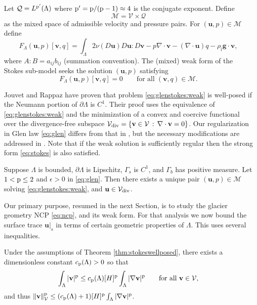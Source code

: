 \documentclass[hidelinks,onefignum,onetabnum,final]{siamart220329}  %
\newcommand{\eps}{\epsilon}
\newcommand{\grad}{\nabla}
\newcommand{\Div}{\nabla\cdot}
\newcommand{\bg}{\mathbf{g}}
\newcommand{\bu}{\mathbf{u}}
\newcommand{\bv}{\mathbf{v}}
\newcommand{\cQ}{\mathcal{Q}}
\newcommand{\cV}{\mathcal{V}}
\newcommand{\pp}{{\text{\textnormal{p}}}}
\newcommand{\rhoi}{\rho_{\text{i}}}
\newcommand{\Vdiv}{\cV_{\text{\textnormal{div}}}}
\begin{document}
Let $\cQ=L^{\pp'}(\Lambda)$ where $\pp'=\pp/(\pp-1)\approx 4$ is the conjugate exponent.  Define
\begin{equation}
\mathcal{M} = \cV \times \cQ \label{eq:glenstokes:mixedspace}
\end{equation}
as the mixed space of admissible velocity and pressure pairs.  For $(\bu,p) \in \mathcal{M}$ define
\begin{equation}
F_\Lambda(\bu,p)[\bv,q] = \int_\Lambda 2 \nu(D\bu) D\bu : D\bv - p \Div\bv - (\Div\bu) q - \rhoi \bg \cdot \bv, \label{eq:glenstokes:fcnl}
\end{equation}
where $A:B=a_{ij}b_{ij}$ (summation convention).  The (mixed) weak form of the Stokes sub-model seeks the solution $(\bu,p)$ satisfying
\begin{equation}
F_\Lambda(\bu,p)[\bv,q] = 0 \qquad \text{for all } (\bv,q) \in \mathcal{M}. \label{eq:glenstokes:weak}
\end{equation}

Jouvet and Rappaz \cite{JouvetRappaz2011} have proven that problem \eqref{eq:glenstokes:weak} is well-posed if the Neumann portion of $\partial\Lambda$ is $C^1$.  Their proof uses the equivalence of \eqref{eq:glenstokes:weak} and the minimization of a convex and coercive functional over the divergence-free subspace $\Vdiv = \{\bv\in\cV\,:\,\Div\bv=0\}$.  Our regularization in Glen law \eqref{eq:glen} differs from that in \cite{JouvetRappaz2011}, but the necessary modifications are addressed in \cite{IsaacStadlerGhattas2015}.  Note that if the weak solution is sufficiently regular then the strong form \eqref{eq:stokes} is also satisfied.

\begin{theorem} \label{thm:stokeswellposed}  Suppose $\Lambda$ is bounded, $\partial\Lambda$ is Lipschitz, $\Gamma_s$ is $C^1$, and $\Gamma_b$ has positive measure.  Let $1<\pp\le 2$ and $\eps>0$ in \eqref{eq:glen}.  Then there exists a unique pair $(\bu,p) \in \mathcal{M}$ solving \eqref{eq:glenstokes:weak}, and $\bu\in \Vdiv$.
\end{theorem}

Our primary purpose, resumed in the next Section, is to study the glacier geometry NCP \eqref{eq:ncp}, and its weak form.  For that analysis we now bound the surface trace $\bu|_s$ in terms of certain geometric properties of $\Lambda$.  This uses several inequalities.

\begin{lemma} \label{lem:poincare}
Under the assumptions of Theorem \ref{thm:stokeswellposed}, there exists a dimensionless constant $c_{\pp}(\Lambda)>0$ so that
\begin{equation}
\int_\Lambda |\bv|^\pp \le c_{\pp}(\Lambda) [H]^\pp \int_\Lambda |\grad\bv|^\pp \qquad \text{for all } \bv \in \cV, \label{eq:poincare}
\end{equation}
and thus $\|\bv\|_{\cV}^\pp \le (c_{\pp}(\Lambda) + 1) [H]^\pp \int_\Lambda |\grad\bv|^\pp$.
\end{lemma}
 
\end{document}
